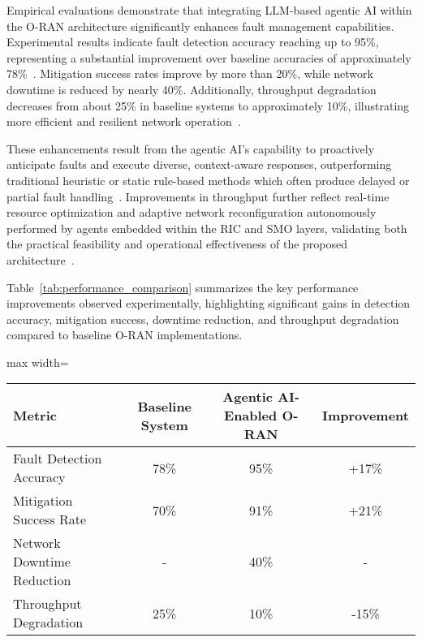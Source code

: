\documentclass[sigconf]{acmart}
\begin{document}
Empirical evaluations demonstrate that integrating LLM-based agentic AI within the O-RAN architecture significantly enhances fault management capabilities. Experimental results indicate fault detection accuracy reaching up to 95\%, representing a substantial improvement over baseline accuracies of approximately 78\%~\cite{ref46,ref55,ref27}. Mitigation success rates improve by more than 20\%, while network downtime is reduced by nearly 40\%. Additionally, throughput degradation decreases from about 25\% in baseline systems to approximately 10\%, illustrating more efficient and resilient network operation~\cite{ref55}. 

These enhancements result from the agentic AI’s capability to proactively anticipate faults and execute diverse, context-aware responses, outperforming traditional heuristic or static rule-based methods which often produce delayed or partial fault handling~\cite{ref27}. Improvements in throughput further reflect real-time resource optimization and adaptive network reconfiguration autonomously performed by agents embedded within the RIC and SMO layers, validating both the practical feasibility and operational effectiveness of the proposed architecture~\cite{ref55}.

Table~\ref{tab:performance_comparison} summarizes the key performance improvements observed experimentally, highlighting significant gains in detection accuracy, mitigation success, downtime reduction, and throughput degradation compared to baseline O-RAN implementations.

\begin{table*}[htbp]
\centering
\caption{Performance Comparison of Agentic AI-Enabled O-RAN vs. Baseline Systems}
\label{tab:performance_comparison}
\begin{adjustbox}{max width=\textwidth}
\begin{tabular}{@{}lccc@{}}
\toprule
Metric & Baseline System & Agentic AI-Enabled O-RAN & Improvement \\
\midrule
Fault Detection Accuracy & 78\% & 95\% & +17\% \\
Mitigation Success Rate & 70\% & 91\% & +21\% \\
Network Downtime Reduction & - & 40\% & - \\
Throughput Degradation & 25\% & 10\% & -15\% \\
\bottomrule
\end{tabular}
\end{adjustbox}
\end{table*}
\end{document}
